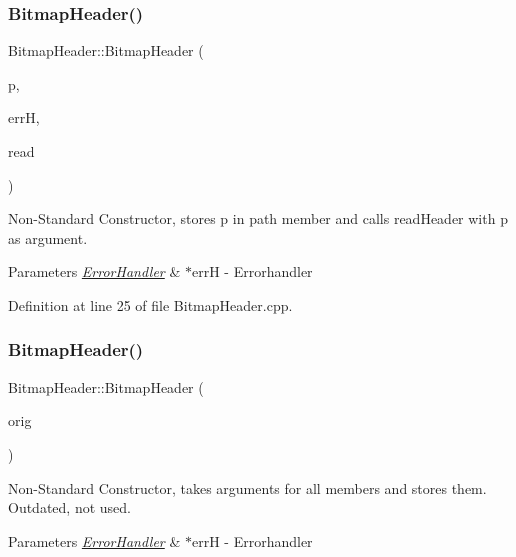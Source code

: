\subsubsection{\texorpdfstring{BitmapHeader()}{BitmapHeader()}\hspace{0.1cm}{\footnotesize\ttfamily [3/4]}}
{\footnotesize\ttfamily Bitmap\+Header\+::\+Bitmap\+Header (\begin{DoxyParamCaption}\item[{std\+::string}]{p,  }\item[{\mbox{\hyperlink{classErrorHandler}{Error\+Handler}} $\ast$}]{errH,  }\item[{bool}]{read }\end{DoxyParamCaption})}



Non-\/\+Standard Constructor, stores p in path member and calls read\+Header with p as argument. 


\begin{DoxyParams}{Parameters}
{\em \mbox{\hyperlink{classErrorHandler}{Error\+Handler}}} & $\ast$errH -\/ Errorhandler \\
\hline
\end{DoxyParams}


Definition at line 25 of file Bitmap\+Header.\+cpp.

\mbox{\label{classBitmapHeader_a25a5481f49d70a8c42a9efc17f17fd48}} 
\subsubsection{\texorpdfstring{BitmapHeader()}{BitmapHeader()}\hspace{0.1cm}{\footnotesize\ttfamily [4/4]}}
{\footnotesize\ttfamily Bitmap\+Header\+::\+Bitmap\+Header (\begin{DoxyParamCaption}\item[{const \mbox{\hyperlink{classBitmapHeader}{Bitmap\+Header}} \&}]{orig }\end{DoxyParamCaption})}



Non-\/\+Standard Constructor, takes arguments for all members and stores them. Outdated, not used. 


\begin{DoxyParams}{Parameters}
{\em \mbox{\hyperlink{classErrorHandler}{Error\+Handler}}} & $\ast$errH -\/ Errorhandler \\
\hline
\end{DoxyParams}



